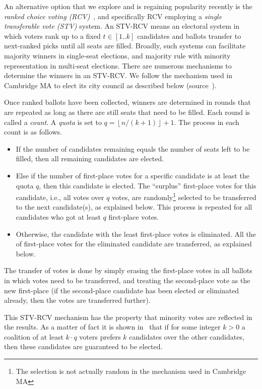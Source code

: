 \documentclass[11pt]{article}
\newcommand{\floor}[1]{\left\lfloor{#1}\right\rfloor}
\begin{document}
An alternative option that we explore and is regaining popularity recently is the {\em ranked choice voting (RCV)}~\cite{rank1}, and specifically RCV employing a {\em single transferable vote (STV)} system. An STV-RCV means an electoral system in which voters rank up to a fixed $t \in [1..k]$ candidates and ballots transfer to next‐ranked picks until all seats are filled. Broadly, such systems can facilitate majority winners in single‐seat elections, and majority rule with minority representation in multi‐seat elections. There are numerous mechanisms to determine the winners in an STV-RCV. We follow the mechanism used in Cambridge MA to elect its city council as described below (source~\cite{rcvdesc}).

Once ranked ballots have been collected, winners are determined in rounds that are repeated as long as there are still seats that need to be filled.
Each round is called a {\em count}. 
A {\em quota} is set to $q=\floor{n/(k+1)}+1$. %
The process in each count is as follows. 
\begin{itemize}
    \item
    If the number of candidates remaining equals the number of seats left to be filled, then all remaining candidates are elected.
    \item 
    Else if the number of first-place votes for a specific candidate is at least the quota $q$, then this candidate is
    elected. The ``surplus'' first-place votes for this candidate, i.e., all votes over $q$ votes, are
    randomly\footnote{The selection is not actually random in the mechanism used in Cambridge MA}
    selected to be transferred to the next candidate(s), as explained below.
    This process is repeated for all candidates who got at least $q$ first-place votes.
    \item
    Otherwise, the candidate with the least first-place votes is eliminated. All the  of first-place votes for the eliminated candidate are transferred, as explained below.
\end{itemize}

The transfer of votes is done by simply erasing the first-place votes in all ballots in which votes need to be transferred,
and treating the second-place vote as the new first-place (if the second-place candidate has been elected or eliminated already, then the votes are transferred further).

This STV-RCV mechanism has the property that minority votes are reflected in the results. As a matter of fact it is shown in~\cite{rcv4} that if for some integer $k>0$ a coalition of at least $k\cdot q$ voters prefers $k$ candidates over the other candidates, then these candidates are guaranteed to be elected. 
\vspace{-0.1in}
\end{document}
